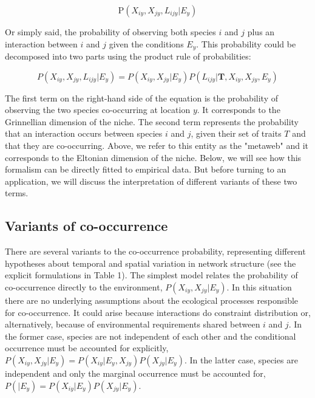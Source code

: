 \documentclass[12pt]{article}
\begin{document}
\begin{equation}
	\text{P}(X_{iy},X_{jy},L_{ijy}|E_y)
\end{equation}

Or simply said, the probability of observing both species $i$ and $j$ plus an
interaction between $i$ and $j$ given the conditions $E_y$. This probability
could be decomposed into two parts using the product rule of probabilities:

\begin{equation}
	P(X_{iy},X_{jy},L_{ijy}|E_y)=P(X_{iy},X_{jy}|E_y)P(L_{ijy}|\mathbf{T},X_{iy},X_{jy},E_y)
\end{equation}

The first term on the right-hand side of the equation is the probability of
observing the two species co-occurring at location $y$. It corresponds to the
Grinnellian dimension of the niche. The second term represents the probability
that an interaction occurs between species $i$ and $j$, given their set of
traits $T$ and that they are co-occurring. Above, we refer to this entity
as the "metaweb" and it corresponds to the Eltonian dimension of the niche. Below,
we will see how this formalism can be directly fitted to empirical data. But
before turning to an application, we will discuss the interpretation of
different variants of these two terms.

\subsection*{Variants of co-occurrence}

There are several variants to the co-occurrence probability, representing
different hypotheses about temporal and spatial variation in network structure
(see the explicit formulations in Table 1). The simplest model relates the
probability of co-occurrence directly to the environment, $P(X_{iy},X_{jy}|E_y)$.
In this situation there are no underlying assumptions about the ecological
processes responsible for co-occurrence. It could arise because interactions
do constraint distribution \citep{Pollock2014, Cazelles2016} or,
alternatively, because of environmental requirements shared between $i$ and
$j$. In the former case, species are not independent of each other and the
conditional occurrence must be accounted for explicitly, $P(X_{iy},X_{jy}
|E_y)=P(X_{iy}|E_y,X_{jy})P(X_{jy}|E_y)$. In the latter case, species are
independent and only the marginal occurrence must be accounted for, $P(
|E_y)=P(X_{iy} |E_y)P(X_{jy} |E_y)$.
\end{document}
